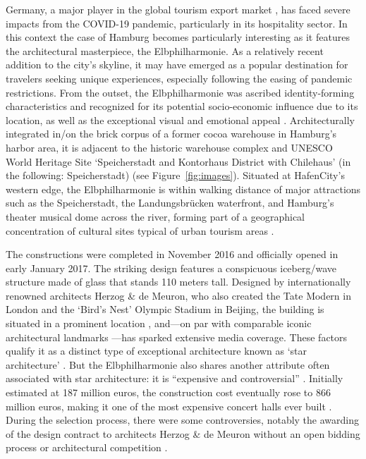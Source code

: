 \documentclass[a4paper, 12pt]{article}
\begin{document}
Germany, a major player in the global tourism export market \citep{gossling2022}, has faced severe impacts from the COVID-19 pandemic, particularly in its hospitality sector. In this context the case of Hamburg becomes particularly interesting as it features the architectural masterpiece, the Elbphilharmonie. As a relatively recent addition to the city's skyline, it may have emerged as a popular destination for travelers seeking unique experiences, especially following the easing of pandemic restrictions. From the outset, the Elbphilharmonie was ascribed identity-forming characteristics and recognized for its potential socio-economic influence due to its location, as well as the exceptional visual and emotional appeal \citep{alaily-mattar2021a}. Architecturally integrated in/on the brick corpus of a former cocoa warehouse in Hamburg's harbor area, it is adjacent to the historic warehouse complex and UNESCO World Heritage Site `Speicherstadt and Kontorhaus District with Chilehaus' (in the following: Speicherstadt) \citep{heuer2022} (see Figure~\ref{fig:images}). Situated at HafenCity's western edge, the Elbphilharmonie is within walking distance of major attractions such as the Speicherstadt, the Landungsbrücken waterfront, and Hamburg's theater musical dome across the river, forming part of a geographical concentration of cultural sites typical of urban tourism areas \citep{ashworth2011}.

The constructions were completed in November 2016 and officially opened in early January 2017. The striking design features a conspicuous iceberg/wave structure made of glass that stands 110 meters tall. Designed by internationally renowned architects Herzog \& de Meuron, who also created the Tate Modern in London and the `Bird's Nest' Olympic Stadium in Beijing, the building is situated in a prominent location \citep{alaily-mattar2018}, and---on par with comparable iconic architectural landmarks \citep{ghalejough2024}---has sparked extensive media coverage. These factors qualify it as a distinct type of exceptional architecture known as `star architecture' \citep{dreher2022}. But the Elbphilharmonie also shares another attribute often associated with star architecture: it is ``expensive and controversial'' \citep[p.~3]{alaily-mattar2022a}. Initially estimated at 187 million euros, the construction cost eventually rose to 866 million euros, making it one of the most expensive concert halls ever built \citep{hofmeister2021}. During the selection process, there were some controversies, notably the awarding of the design contract to architects Herzog \& de Meuron without an open bidding process or architectural competition \citep[p.~101]{alaily-mattar2021a}.
\end{document}
